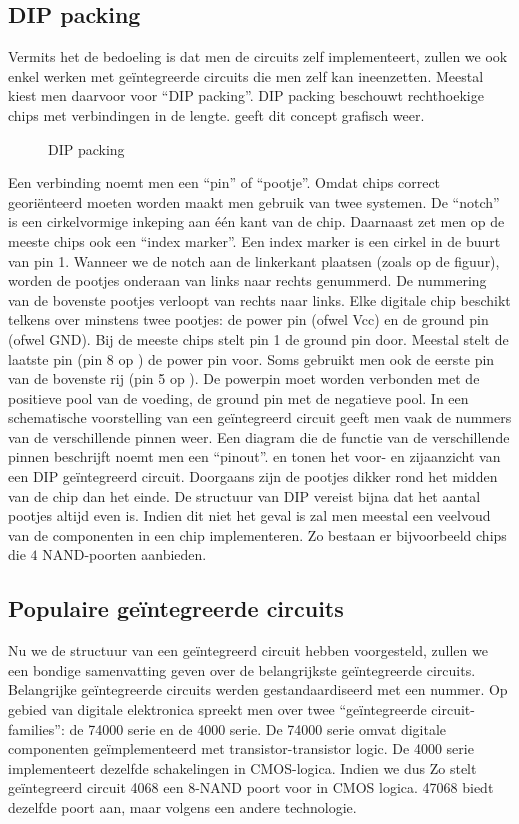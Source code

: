 \subsection{DIP packing}
Vermits het de bedoeling is dat men de circuits zelf implementeert, zullen we ook enkel werken met ge\"integreerde circuits die men zelf kan ineenzetten. Meestal kiest men daarvoor voor ``DIP packing''. DIP packing beschouwt rechthoekige chips met verbindingen in de lengte.  geeft dit concept grafisch weer.
\begin{figure}[hbt]
\centering
{}
\caption{DIP packing}
\end{figure}
Een verbinding noemt men een ``pin'' of ``pootje''. Omdat chips correct geori\"enteerd moeten worden maakt men gebruik van twee systemen. De ``notch'' is een cirkelvormige inkeping aan \'e\'en kant van de chip. Daarnaast zet men op de meeste chips ook een ``index marker''. Een index marker is een cirkel in de buurt van pin 1. Wanneer we de notch aan de linkerkant plaatsen (zoals op de figuur), worden de pootjes onderaan van links naar rechts genummerd. De nummering van de bovenste pootjes verloopt van rechts naar links. Elke digitale chip beschikt telkens over minstens twee pootjes: de power pin (ofwel \mbox{Vcc}) en de ground pin (ofwel \mbox{GND}). Bij de meeste chips stelt pin 1 de ground pin door. Meestal stelt de laatste pin (pin 8 op ) de power pin voor. Soms gebruikt men ook de eerste pin van de bovenste rij (pin 5 op ). De powerpin moet worden verbonden met de positieve pool van de voeding, de ground pin met de negatieve pool. In een schematische voorstelling van een ge\"integreerd circuit geeft men vaak de nummers van de verschillende pinnen weer. Een diagram die de functie van de verschillende pinnen beschrijft noemt men een ``pinout''.  en  tonen het voor- en zijaanzicht van een DIP ge\"integreerd circuit. Doorgaans zijn de pootjes dikker rond het midden van de chip dan het einde. De structuur van DIP vereist bijna dat het aantal pootjes altijd even is. Indien dit niet het geval is zal men meestal een veelvoud van de componenten in een chip implementeren. Zo bestaan er bijvoorbeeld chips die $4$ NAND-poorten aanbieden.
\subsection{Populaire ge\"integreerde circuits}
Nu we de structuur van een ge\"integreerd circuit hebben voorgesteld, zullen we een bondige samenvatting geven over de belangrijkste ge\"integreerde circuits. Belangrijke ge\"integreerde circuits werden gestandaardiseerd met een nummer. Op gebied van digitale elektronica spreekt men over twee ``ge\"integreerde circuit-families'': de 74000 serie en de 4000 serie. De 74000 serie omvat digitale componenten ge\"implementeerd met transistor-transistor logic. De 4000 serie implementeert dezelfde schakelingen in CMOS-logica. Indien we dus Zo stelt ge\"integreerd circuit 4068 een 8-NAND poort voor in CMOS logica. 47068 biedt dezelfde poort aan, maar volgens een andere technologie.
